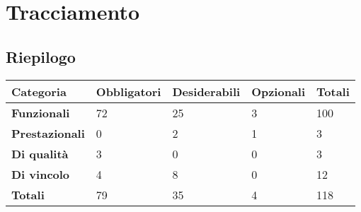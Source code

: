 %


\section{Tracciamento} %
\label{sec:tracciamento}
	
	


\subsection{Riepilogo}

\begin{center}

	\def\arraystretch{1.5}
	\bgroup
	\begin{longtable}{| p{2.7cm} | p{2.4cm} | p{2.4cm} | p{2.4cm} | p{1.7cm} |}

		\hline
		\textbf{Categoria} & \textbf{Obbligatori} & \textbf{Desiderabili} & \textbf{Opzionali} & \textbf{Totali} \\
		\hline

		\textbf{Funzionali}  & 72 & 25 & 3 & 100\\
		\hline
		\textbf{Prestazionali} & 0 & 2 & 1 & 3\\
		\hline
		\textbf{Di qualità} & 3 & 0 & 0 & 3\\
		\hline
		\textbf{Di vincolo} & 4 & 8 & 0 & 12\\
		\hline
		\textbf{Totali}  & 79 & 35 & 4 & 118\\
		\hline
	\end{longtable}
	\egroup
\end{center}

